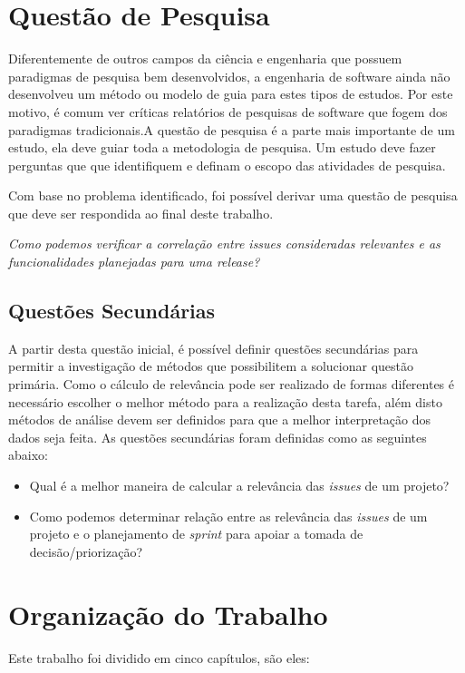 \section{Questão de Pesquisa}
\label{int:que}

Diferentemente de outros campos da ciência e engenharia que possuem paradigmas de pesquisa bem desenvolvidos, a engenharia de software ainda não desenvolveu um método ou modelo de guia para estes tipos de estudos. Por este motivo, é comum ver críticas relatórios de pesquisas de software que fogem dos paradigmas tradicionais\cite{shaw}.A questão de pesquisa é a parte mais importante de um estudo, ela deve guiar toda a metodologia de pesquisa. Um estudo deve fazer perguntas que que identifiquem e definam o escopo das atividades de pesquisa\cite{guidelines}.

Com base no problema identificado, foi possível derivar uma questão de pesquisa que deve ser respondida ao final deste trabalho.

\begin{center}
    \textit{Como podemos verificar a correlação entre \textit{issues} consideradas relevantes e as funcionalidades planejadas para uma \textit{release}?}
\end{center}

\subsection{Questões Secundárias}
\label{int:que:sec}

A partir desta questão inicial, é possível definir questões secundárias para permitir a investigação de métodos que possibilitem a solucionar questão primária. Como o cálculo de relevância pode ser realizado de formas diferentes é necessário escolher o melhor método para a realização desta tarefa, além disto métodos de análise devem ser definidos para que a melhor interpretação dos dados seja feita. As questões secundárias foram definidas como as seguintes abaixo:

\begin{itemize}
    \item Qual é a melhor maneira de calcular a relevância das \textit{issues} de um projeto?
    \item Como podemos determinar relação entre as relevância das \textit{issues} de um projeto e o planejamento de \textit{sprint} para apoiar a tomada de decisão/priorização?
\end{itemize}

\section{Organização do Trabalho}
\label{int:org}
Este trabalho foi dividido em cinco capítulos, são eles:

